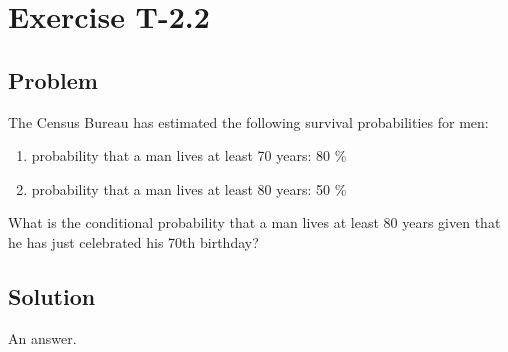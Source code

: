 \section*{Exercise T-2.2}

\subsection*{Problem}
The Census Bureau has estimated the following survival probabilities for men:
\begin{enumerate}
	\item probability that a man lives at least 70 years: 80 \%
	\item probability that a man lives at least 80 years: 50 \%
\end{enumerate}

What is the conditional probability that a man lives at least 80 years given that he has just celebrated his 70th birthday?

\subsection*{Solution}
An answer.
